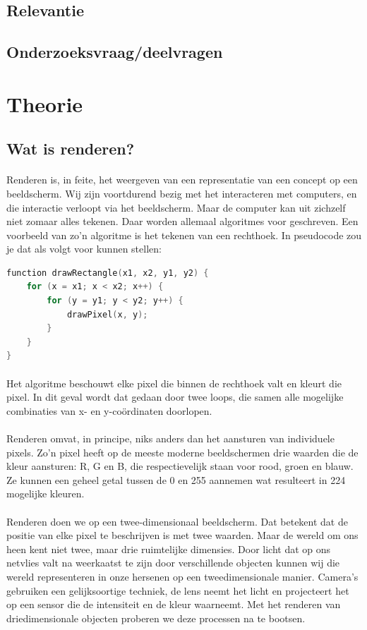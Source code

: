 \documentclass[12pt, a4paper]{article}
\begin{document}
\subsection{Relevantie}
\subsection{Onderzoeksvraag/deelvragen }
\clearpage
\section{Theorie}
\subsection{Wat is renderen?}
\paragraph{}
Renderen is, in feite, het weergeven van een representatie van een concept op een beeldscherm. Wij zijn voortdurend bezig met het interacteren met computers, en die interactie verloopt via het beeldscherm. Maar de computer kan uit zichzelf niet zomaar alles tekenen. Daar worden allemaal algoritmes voor geschreven. Een voorbeeld van zo'n algoritme is het tekenen van een rechthoek. In pseudocode zou je dat als volgt voor kunnen stellen:
\begin{lstlisting}[language=C]
function drawRectangle(x1, x2, y1, y2) {
	for (x = x1; x < x2; x++) {
		for (y = y1; y < y2; y++) {
			drawPixel(x, y);
		}
	}
}
\end{lstlisting}
\paragraph{}
Het algoritme beschouwt elke pixel die binnen de rechthoek valt en kleurt die pixel. In dit geval wordt dat gedaan door twee loops, die samen alle mogelijke combinaties van x- en y-coördinaten doorlopen. 

\paragraph{}
Renderen omvat, in principe, niks anders dan het aansturen van individuele pixels. Zo'n pixel heeft op de meeste moderne beeldschermen drie waarden die de kleur aansturen: R, G en B, die respectievelijk staan voor rood, groen en blauw. Ze kunnen een geheel getal tussen de 0 en 255 aannemen wat resulteert in 224 mogelijke kleuren.
	
\paragraph{}
Renderen doen we op een twee-dimensionaal beeldscherm. Dat betekent dat de positie van elke pixel te beschrijven is met twee waarden. Maar de wereld om ons heen kent niet twee, maar drie ruimtelijke dimensies. Door licht dat op ons netvlies valt na weerkaatst te zijn door verschillende objecten kunnen wij die wereld representeren in onze hersenen op een tweedimensionale manier. Camera's gebruiken een gelijksoortige techniek, de lens neemt het licht en projecteert het op een sensor die de intensiteit en de kleur waarneemt. Met het renderen van driedimensionale objecten proberen we deze processen na te bootsen. 
\end{document}
